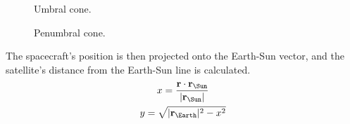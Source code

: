 \begin{figure}
\caption{Umbral cone.}
\label{fig:Umbra}
\centering
\def\svgwidth{\figurewidth}
\end{figure}

\begin{figure}
\caption{Penumbral cone.}
\label{fig:Penumbra}
\centering
\def\svgwidth{\figurewidth}
\end{figure}

The spacecraft's position is then projected onto the Earth-Sun vector, and the satellite's distance from the Earth-Sun line is calculated.
\begin{subequations}
\begin{gather}
x = \frac{\vec{r}\cdot\vec{r_\Sun}}{|\vec{r_\Sun}|} \\
y = \sqrt{|\vec{r_\Earth}|^2-x^2} 
\end{gather}
\end{subequations}

